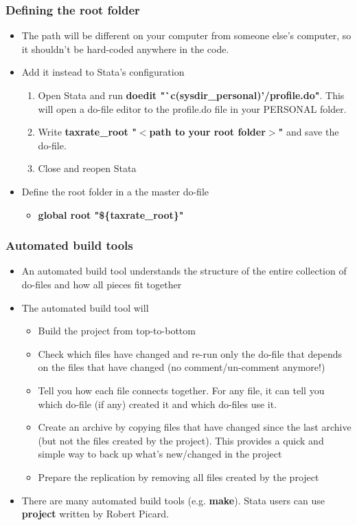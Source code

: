 \documentclass{beamer}
\begin{document}
\frame
{
	\frametitle{Defining the root folder}
	
	\begin{itemize}
		\item The path will be different on your computer from someone else's computer, so it shouldn't be hard-coded anywhere in the code.
\vspace{0.2cm}
		\item Add it instead to Stata's configuration 
		\begin{enumerate}
			\item Open Stata and run \textbf{doedit "`c(sysdir\_personal)'/profile.do"}. This will open a do-file editor to the profile.do file in your PERSONAL folder.
			\item Write \textbf{taxrate\_root "$<$path to your root folder$>$"} and save the do-file.
			\item Close and reopen Stata
		\end{enumerate}
\vspace{0.2cm}
	\item Define the root folder in a the master do-file
	\begin{itemize}
		\item  \textbf{global root "\$\{taxrate\_root\}"}
	\end{itemize}
	\end{itemize}	
	
}

\frame
{
	\frametitle{Automated build tools}
	
	\begin{itemize}
		\item An automated build tool understands the structure of the entire collection of do-files and how all pieces fit together
		\vspace{0.2cm}
		\item The automated build tool will
		\begin{itemize}
			\item Build the project from top-to-bottom
			\item Check which files have changed and re-run only the do-file that depends on the files that have changed (no comment/un-comment anymore!)
			\item Tell you how each file connects together. For any file, it can tell you which do-file (if any) created it and which do-files use it.
			\item Create an archive by copying files that have changed since the last archive (but not the files created by the project). This provides a quick and simple way to back up
			what's new/changed in the project
			\item Prepare the replication by removing all files created by the project
		\end{itemize}
		\item There are many automated build tools (e.g. \textbf{make}). Stata users can use  \textbf{project} written by Robert Picard.
		\end{itemize}	
	
}
\end{document}
